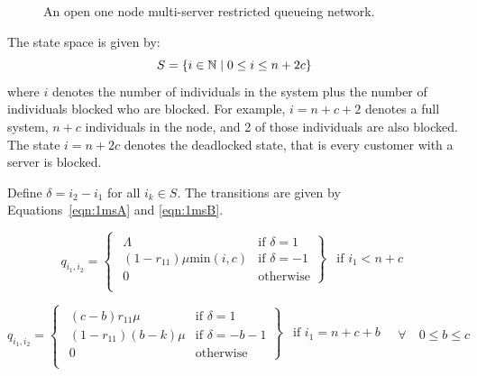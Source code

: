 \documentclass{article}
\numberwithin{equation}{section}
\begin{document}
\begin{figure}[!htbp]
  \begin{center}
  
  \end{center}
  \caption{An open one node multi-server restricted queueing network.}
  \label{fig:queueingnetwork_1nodemulti}
\end{figure}

The state space is given by:
        \[S = \{i\in\mathbb{N} \nonscript\; | \nonscript\; 0 \leq i \leq n + 2c\}\]
where \(i\) denotes the number of individuals in the system plus the number of individuals blocked who are blocked.
For example, $i=n+c+2$ denotes a full system, $n+c$ individuals in the node, and 2 of those individuals are also blocked.
The state $i=n+2c$ denotes the deadlocked state, that is every customer with a server is blocked.

Define $\delta = i_2 - i_1$ for all $i_k \in S$. The transitions are given by Equations~\ref{eqn:1msA} and \ref{eqn:1msB}.

\begin{equation}\label{eqn:1msA}
  q_{i_1, i_2} = \left\{
  \begin{array}{rr}
    \left. \begin{array}{rr}
      \Lambda & \text{if } \delta = 1 \\
      (1-r_{11})\mu\text{min}(i, c) & \text{if } \delta = -1 \\
      0 & \text{otherwise}
    \end{array} \right\} & \text{if } i_1 < n + c \\
  \end{array} \right.
\end{equation}

\begin{equation}\label{eqn:1msB}
  q_{i_1, i_2} = \left\{
  \begin{array}{rr}
    \left. \begin{array}{rr}
      (c-b)r_{11}\mu & \text{if } \delta = 1 \\
      (1-r_{11})(b-k)\mu & \text{if } \delta = -b-1\\
      0 & \text{otherwise}
    \end{array} \right\} & \text{if } i_1 = n + c + b \\
  \end{array} \right.
  \quad \forall \quad 0 \leq b \leq c
\end{equation}
\end{document}
